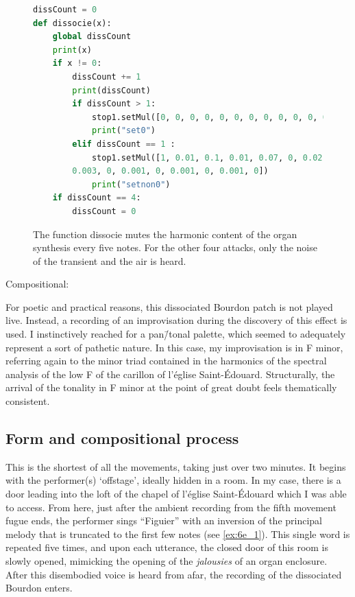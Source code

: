 \documentclass[12pt,twoside,maitrise]{dms_ks}
\theoremstyle{definition}
\begin{document}
{{\begin{figure}[H]
\begin{lstlisting}[language=Python]
dissCount = 0
def dissocie(x):
    global dissCount
    print(x)
    if x != 0:
        dissCount += 1
        print(dissCount)
        if dissCount > 1:
            stop1.setMul([0, 0, 0, 0, 0, 0, 0, 0, 0, 0, 0, 0, 0, 0, 0, 0, 0, 0, 0, 0])
            print("set0")
        elif dissCount == 1 :
            stop1.setMul([1, 0.01, 0.1, 0.01, 0.07, 0, 0.02, 0, 0.01, 0, 0.003, 0,
	    0.003, 0, 0.001, 0, 0.001, 0, 0.001, 0])
            print("setnon0")
    if dissCount == 4:
        dissCount = 0
\end{lstlisting}
\caption{The function dissocie mutes the harmonic content of the organ synthesis every five notes. For the other four attacks, only the noise of the transient and the air is heard.}
\label{fig:dissocie}
\end{figure}

Compositional:

For poetic and practical reasons, this dissociated Bourdon patch is not played live.
Instead, a recording of an improvisation during the discovery of this effect is used.
I instinctively reached for a pan\=/tonal palette, which seemed to adequately represent a sort of pathetic nature.
In this case, my improvisation is in F minor, referring again to the minor triad contained in the harmonics of the spectral analysis of the low F of the carillon of l'église Saint-Édouard.
Structurally, the arrival of the tonality in F minor at the point of great doubt feels thematically consistent.

\subsection{Form and compositional process}

This is the shortest of all the movements, taking just over two minutes. It begins with the performer(s) `offstage', ideally hidden in a room. In my case, there is a door leading into the loft of the chapel of l'église Saint-Édouard which I was able to access. 
From here, just after the ambient recording from the fifth movement fugue ends, the performer sings “Figuier” with an inversion of the principal melody that is truncated to the first few notes (see \cref{ex:6e_1}). 
This single word is repeated five times, and upon each utterance, the closed door of this room is slowly opened, mimicking the opening of the \textit{jalousies} of an organ enclosure.
After this disembodied voice is heard from afar, the recording of the dissociated Bourdon enters.

}}
\end{document}
